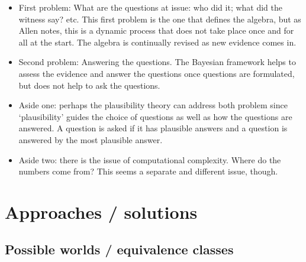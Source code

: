 \documentclass[
  11pt,
  dvipsnames,enabledeprecatedfontcommands]{scrartcl}
\begin{document}
\begin{itemize}
\item
  First problem: What are the questions at issue: who did it; what did
  the witness say? etc. This first problem is the one that defines the
  algebra, but as Allen notes, this is a dynamic process that does not
  take place once and for all at the start. The algebra is continually
  revised as new evidence comes in.
\item
  Second problem: Answering the questions. The Bayesian framework helps
  to assess the evidence and answer the questions once questions are
  formulated, but does not help to ask the questions.
\item
  Aside one: perhaps the plausibility theory can address both problem
  since `plausibility' guides the choice of questions as well as how the
  questions are answered. A question is asked if it has plausible
  answers and a question is answered by the most plausible answer.
\item
  Aside two: there is the issue of computational complexity. Where do
  the numbers come from? This seems a separate and different issue,
  though.
\end{itemize}

\hypertarget{approaches-solutions}{%
\section{Approaches / solutions}\label{approaches-solutions}}

\hypertarget{possible-worlds-equivalence-classes}{%
\subsection{Possible worlds / equivalence
classes}\label{possible-worlds-equivalence-classes}}
\end{document}
